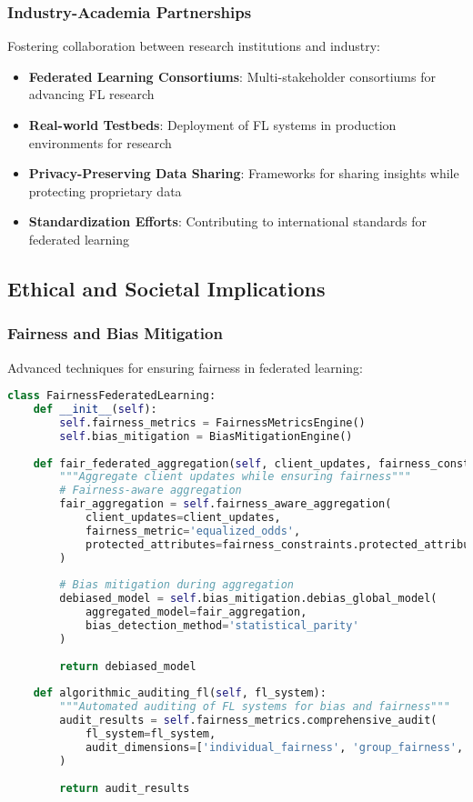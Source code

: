 \subsubsection{Industry-Academia Partnerships}

Fostering collaboration between research institutions and industry:

\begin{itemize}
    \item \textbf{Federated Learning Consortiums}: Multi-stakeholder consortiums for advancing FL research
    \item \textbf{Real-world Testbeds}: Deployment of FL systems in production environments for research
    \item \textbf{Privacy-Preserving Data Sharing}: Frameworks for sharing insights while protecting proprietary data
    \item \textbf{Standardization Efforts}: Contributing to international standards for federated learning
\end{itemize}

\subsection{Ethical and Societal Implications}

\subsubsection{Fairness and Bias Mitigation}

Advanced techniques for ensuring fairness in federated learning:

\begin{lstlisting}[language=python, caption=Fairness in Federated Learning]
class FairnessFederatedLearning:
    def __init__(self):
        self.fairness_metrics = FairnessMetricsEngine()
        self.bias_mitigation = BiasMitigationEngine()
        
    def fair_federated_aggregation(self, client_updates, fairness_constraints):
        """Aggregate client updates while ensuring fairness"""
        # Fairness-aware aggregation
        fair_aggregation = self.fairness_aware_aggregation(
            client_updates=client_updates,
            fairness_metric='equalized_odds',
            protected_attributes=fairness_constraints.protected_attributes
        )
        
        # Bias mitigation during aggregation
        debiased_model = self.bias_mitigation.debias_global_model(
            aggregated_model=fair_aggregation,
            bias_detection_method='statistical_parity'
        )
        
        return debiased_model
        
    def algorithmic_auditing_fl(self, fl_system):
        """Automated auditing of FL systems for bias and fairness"""
        audit_results = self.fairness_metrics.comprehensive_audit(
            fl_system=fl_system,
            audit_dimensions=['individual_fairness', 'group_fairness', 'counterfactual_fairness']
        )
        
        return audit_results
\end{lstlisting}

